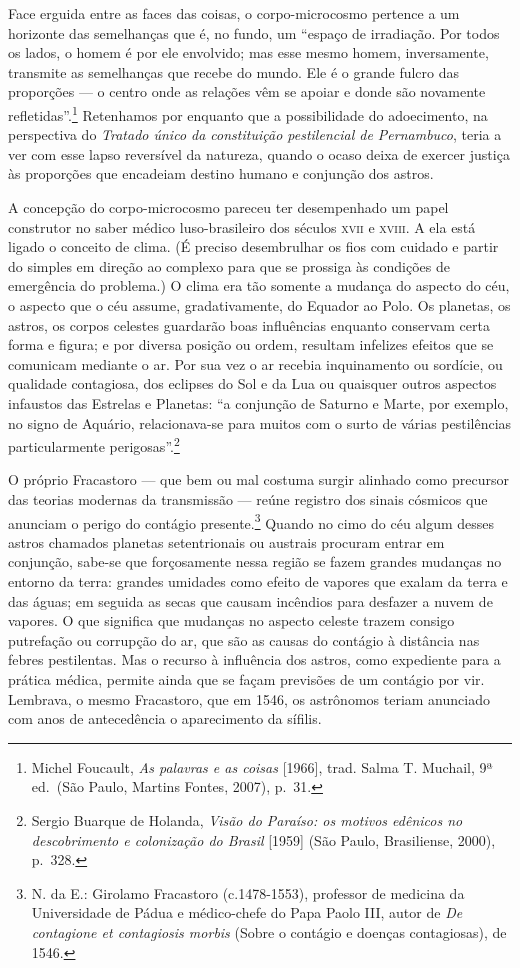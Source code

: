Face erguida entre as faces das coisas, o corpo-microcosmo pertence a um
horizonte das semelhanças que é, no fundo, um ``espaço de irradiação.
Por todos os lados, o homem é por ele envolvido; mas esse mesmo homem,
inversamente, transmite as semelhanças que recebe do mundo. Ele é o
grande fulcro das proporções --- o centro onde as relações vêm se apoiar
e donde são novamente refletidas''.\footnote{Michel Foucault, \textit{As
  palavras e as coisas} {[}1966{]}, trad. Salma T. Muchail, 9ª ed.~(São
  Paulo, Martins Fontes, 2007), p.~31.} Retenhamos por enquanto que a
possibilidade do adoecimento, na perspectiva do \textit{Tratado único da
constituição pestilencial de Pernambuco}, teria a ver com esse lapso
reversível da natureza, quando o ocaso deixa de exercer justiça às
proporções que encadeiam destino humano e conjunção dos astros.

A concepção do corpo-microcosmo pareceu ter desempenhado um papel
construtor no saber médico luso-brasileiro dos séculos \textsc{xvii} e \textsc{xviii}. A
ela está ligado o conceito de clima. (É preciso desembrulhar os fios com
cuidado e partir do simples em direção ao complexo para que se prossiga
às condições de emergência do problema.) O clima era tão somente a
mudança do aspecto do céu, o aspecto que o céu assume, gradativamente,
do Equador ao Polo. Os planetas, os astros, os corpos celestes guardarão
boas influências enquanto conservam certa forma e figura; e por diversa
posição ou ordem, resultam infelizes efeitos que se comunicam mediante o
ar. Por sua vez o ar recebia inquinamento ou sordície, ou qualidade
contagiosa, dos eclipses do Sol e da Lua ou quaisquer outros aspectos
infaustos das Estrelas e Planetas: ``a conjunção de Saturno e Marte, por
exemplo, no signo de Aquário, relacionava-se para muitos com o surto de
várias pestilências particularmente perigosas''.\footnote{Sergio Buarque
  de Holanda, \textit{Visão do Paraíso: os motivos edênicos no
  descobrimento e colonização do Brasil} {[}1959{]} (São Paulo,
  Brasiliense, 2000), p.~328.}

O próprio Fracastoro --- que bem ou mal costuma surgir alinhado como
precursor das teorias modernas da transmissão --- reúne registro dos
sinais cósmicos que anunciam o perigo do contágio presente.\footnote{N.
  da E.: Girolamo Fracastoro (c.1478-1553), professor de medicina da
  Universidade de Pádua e médico-chefe do Papa Paolo III, autor de
  \textit{De contagione et contagiosis morbis} (Sobre o contágio e doenças
  contagiosas), de 1546.} Quando no cimo do céu algum desses astros
chamados planetas setentrionais ou austrais procuram entrar em
conjunção, sabe-se que forçosamente nessa região se fazem grandes
mudanças no entorno da terra: grandes umidades como efeito de vapores
que exalam da terra e das águas; em seguida as secas que causam
incêndios para desfazer a nuvem de vapores. O que significa que mudanças
no aspecto celeste trazem consigo putrefação ou corrupção do ar, que são
as causas do contágio à distância nas febres pestilentas. Mas o recurso
à influência dos astros, como expediente para a prática médica, permite
ainda que se façam previsões de um contágio por vir. Lembrava, o mesmo
Fracastoro, que em 1546, os astrônomos teriam anunciado com anos de
antecedência o aparecimento da sífilis.

